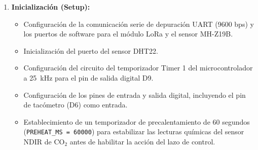 \begin{enumerate}
    \item \textbf{Inicialización (Setup):}
          \begin{itemize}
              \item Configuración de la comunicación serie de depuración UART (9600 bps) y los puertos de software para el módulo LoRa y el sensor MH-Z19B.
              \item Inicialización del puerto del sensor DHT22.
              \item Configuración del circuito del temporizador Timer 1 del microcontrolador a 25~kHz para el pin de salida digital D9.
              \item Configuración de los pines de entrada y salida digital, incluyendo el pin de tacómetro (D6) como entrada.
              \item Establecimiento de un temporizador de precalentamiento de 60 segundos (\texttt{PREHEAT\_MS = 60000}) para estabilizar las lecturas químicas del sensor NDIR de CO$_2$ antes de habilitar la acción del lazo de control.
          \end{itemize}


\end{enumerate}

